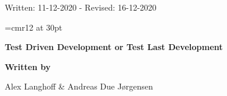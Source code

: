 
    \begin{center}
        Written: 11-12-2020 -
        Revised: 16-12-2020

    \font\myfont=cmr12 at 30pt
    \vspace*{1cm}
   
    \vspace{0.5cm}
    \textbf{\myfont Test Driven Development or Test Last Development}
    
    \vspace{1cm}
    
    \textbf{Written by}
    
    \vspace{0.5cm}
    Alex Langhoff \& Andreas Due Jørgensen
    
           \vspace{0.8cm}
       \end{center}

